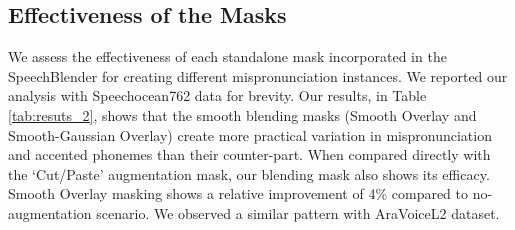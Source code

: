 \documentclass{INTERSPEECH2023}
\begin{document}
\subsection{Effectiveness of the Masks } We assess the effectiveness of each standalone mask incorporated in the SpeechBlender for creating different mispronunciation instances. We reported our analysis with Speechocean762 data for brevity. Our results, in Table \ref{tab:resuts_2}, shows that the smooth blending masks (Smooth Overlay and Smooth-Gaussian Overlay) create more practical variation in mispronunciation and accented phonemes than their counter-part. When compared directly with the `Cut/Paste' augmentation mask, our blending mask also shows its efficacy. Smooth Overlay masking shows a relative improvement of 4\% compared to no-augmentation scenario. We observed a similar pattern with AraVoiceL2 dataset.
\end{document}
